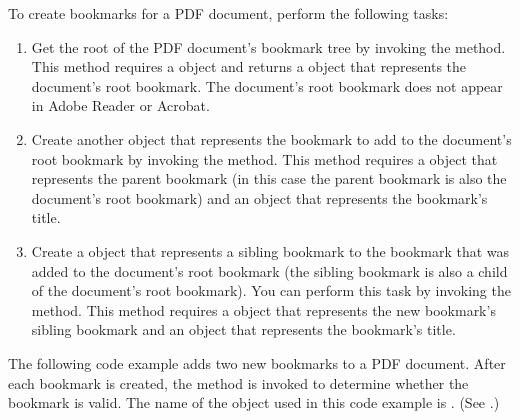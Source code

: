 \documentclass[letterpaper,12pt,english,openany,oneside]{sphinxmanual}
\begin{document}
To create bookmarks for a PDF document, perform the following tasks:
\begin{enumerate}
%
\item {} 
Get the root of the PDF document’s bookmark tree by invoking the  method. This method requires a  object and returns a  object that represents the document’s root bookmark. The document’s root bookmark does not appear in Adobe Reader or Acrobat.

\item {} 
Create another  object that represents the bookmark to add to the document’s root bookmark by invoking the  method. This method requires a  object that represents the parent bookmark (in this case the parent bookmark is also the document’s root bookmark) and an  object that represents the bookmark’s title.

\item {} 
Create a  object that represents a sibling bookmark to the bookmark that was added to the document’s root bookmark (the sibling bookmark is also a child of the document’s root bookmark). You can perform this task by invoking the  method. This method requires a  object that represents the new bookmark’s sibling bookmark and an  object that represents the bookmark’s title.

\end{enumerate}

The following code example adds two new bookmarks to a PDF document. After each bookmark is created, the  method is invoked to determine whether the bookmark is valid. The name of the  object used in this code example is . (See .)
\end{document}
